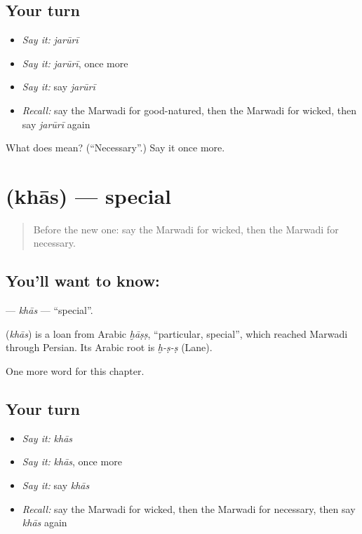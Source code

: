 \subsection*{Your turn}
\begin{itemize}
\raggedright
  \item \emph{Say it:} \emph{jarūrī}
  \item \emph{Say it:} \emph{jarūrī}, once more
  \item \emph{Say it:} say \emph{jarūrī}
  \item \emph{Recall:} say the Marwadi for good-natured, then the Marwadi for wicked, then say \emph{jarūrī} again
\end{itemize}

\begin{tcolorbox}[breakable,colback=teal!4,colframe=teal!35!black,title={Before you move on}]
What does  mean? (\textquotedblleft{}Necessary\textquotedblright{}.) Say it once more.
\end{tcolorbox}
\section[\texorpdfstring{\mw{खास} (khās)}{खास (khās)}]{ (khās) — special}

\label{lesson:MW-C148-khas}



\begin{quote}
Before the new one: say the Marwadi for wicked, then the Marwadi for necessary.
\end{quote}

\subsection*{You'll want to know: }
\textbf{} — \emph{khās} — \textquotedblleft{}special\textquotedblright{}.

\begin{cousinweb}
\textbf{} (\emph{khās}) is a loan from Arabic \emph{ḫāṣṣ}, \textquotedblleft{}particular, special\textquotedblright{}, which reached Marwadi through Persian. Its Arabic root is \emph{ḫ-ṣ-ṣ} (Lane).
\end{cousinweb}

\begin{grammarlens}[title={What you've built}]
One more word for this chapter.
\end{grammarlens}

\subsection*{Your turn}
\begin{itemize}
\raggedright
  \item \emph{Say it:} \emph{khās}
  \item \emph{Say it:} \emph{khās}, once more
  \item \emph{Say it:} say \emph{khās}
  \item \emph{Recall:} say the Marwadi for wicked, then the Marwadi for necessary, then say \emph{khās} again
\end{itemize}

